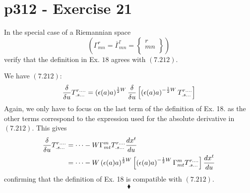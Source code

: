 \section{p312 - Exercise 21}
\begin{tcolorbox}
In the special case of a Riemannian space 
$$\left(\Gamma^r_{mn}=  \overline{\Gamma}^r_{mn}=\begin{Bmatrix}
r\\
m n\\
\end{Bmatrix}\right)$$
verify that the definition in Ex. $18$ agrees with $\mathbf{(7.212)}$.
\end{tcolorbox}
We have $\mathbf{(7.212)}$:
$$\fdv{}{u}T^{r\dots .}_{.s\dots} = \left(\epsilon(a)a\right)^{\half W}\fdv{}{u}\left[\left(\epsilon(a)a \right)^{-\half W}T^{r\dots .}_{.s\dots}\right]$$
Again, we only have to focus on the last term of the definition of Ex. 18. as the other terms correspond to the expression used for the absolute derivative in $\mathbf{(7.212)}$.
This gives
\begin{align*}
\fdv{}{u}T^{r\dots .}_{.s\dots} &= \dots -W\Gamma^m_{mt}T^{r . \dots}_{.s\dots}\dv{x^t}{u}\\
&= \dots-W\left(\epsilon(a)a\right)^{\half W} \left[\left(\epsilon(a)a \right)^{-\half W}\Gamma^m_{mt}T^{r . \dots}_{.s\dots}\right]\dv{x^t}{u}
\end{align*}
confirming that the definition of Ex. 18 is compatible with  $\mathbf{(7.212)}$. 
$$\blacklozenge$$
\newpage



